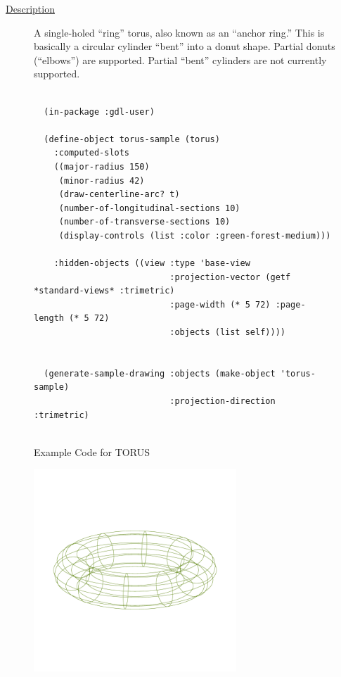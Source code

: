 \documentclass [11pt]{book}
\begin{document}
\begin{itemize}
\begin{description}
\item [
\underline{Description}]


A single-holed ``ring'' torus, also known as an ``anchor ring.''
This is basically a circular cylinder ``bent'' into a donut shape. Partial donuts (``elbows'') are supported.
Partial ``bent'' cylinders are not currently supported.



\end{description}




\begin{figure}
\begin{lrbox}{\boxedverb}
\begin{minipage}{\linewidth}
{\small

\begin{verbatim}
  
  (in-package :gdl-user)
  
  (define-object torus-sample (torus)
    :computed-slots
    ((major-radius 150)
     (minor-radius 42)
     (draw-centerline-arc? t)
     (number-of-longitudinal-sections 10)
     (number-of-transverse-sections 10)
     (display-controls (list :color :green-forest-medium)))

    :hidden-objects ((view :type 'base-view
                           :projection-vector (getf *standard-views* :trimetric)
                           :page-width (* 5 72) :page-length (* 5 72)
                           :objects (list self))))
  

  (generate-sample-drawing :objects (make-object 'torus-sample) 
                           :projection-direction :trimetric)
                  

\end{verbatim}}
\end{minipage}
\end{lrbox}
\fbox{\usebox{\boxedverb}}

\caption{Example Code for TORUS}

\label{fig:example-code-TORUS}

\end{figure}

\begin{figure}
\begin{center}
\includegraphics[width=3in,height=3in]{../images/example-TORUS.pdf}
\end{center}


\end{figure}
\end{itemize}
\end{document}
